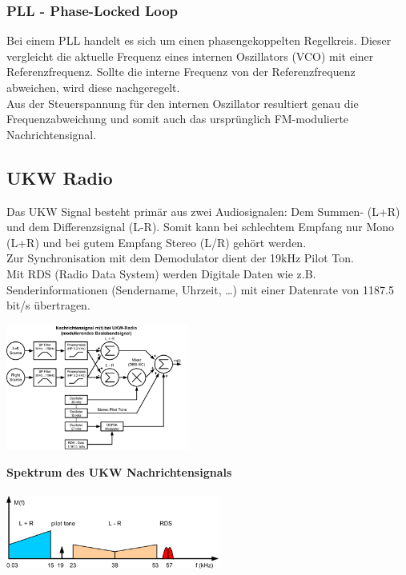 \subsubsection{PLL - Phase-Locked Loop}
	Bei einem PLL handelt es sich um einen phasengekoppelten Regelkreis. Dieser vergleicht die aktuelle Frequenz eines internen Oszillators (VCO) mit einer Referenzfrequenz. Sollte die interne Frequenz von der Referenzfrequenz abweichen, wird diese nachgeregelt. \\
	Aus der Steuerspannung für den internen Oszillator resultiert genau die Frequenzabweichung und somit auch das ursprünglich FM-modulierte Nachrichtensignal.\\


\subsection{UKW Radio}
Das UKW Signal besteht primär aus zwei Audiosignalen: Dem Summen- (L+R) und dem Differenzsignal (L-R).
Somit kann bei schlechtem Empfang nur Mono (L+R) und bei gutem Empfang Stereo (L/R) gehört werden. \\
Zur Synchronisation mit dem Demodulator dient der 19kHz Pilot Ton. \\
Mit RDS (Radio Data System) werden Digitale Daten wie z.B. Senderinformationen (Sendername, Uhrzeit,
\ldots) mit einer Datenrate von 1187.5 bit/s übertragen. \\
\begin{minipage}{9cm}
	\includegraphics[width=6cm]{bilder/ukw_blockdiagramm.png}
\end{minipage}
\begin{minipage}{9cm} 
	\textbf{Spektrum des UKW Nachrichtensignals} \\ \\
    \includegraphics[width=7cm]{bilder/ukw_spektrum.png}
\end{minipage}
